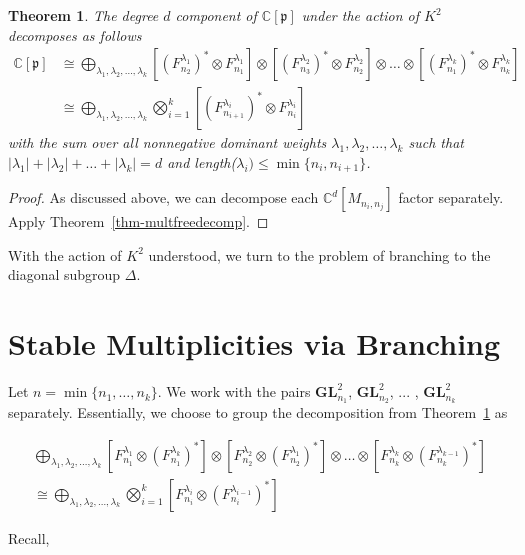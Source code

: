 \documentclass[11pt]{article}
\newtheorem{thm}[theo]{Theorem}
\theoremstyle{definition}
\numberwithin{equation}{section}
\newcommand{\C}{\mathbb{C}}
\newcommand{\p}{\mathfrak{p}}
\newcommand{\GL}{\textbf{GL}}
\begin{document}
    \begin{thm} \label{thm-biggroupdecomp}
        The degree $d$ component of $\C[\p]$ under the action of $K^2$ decomposes as follows 
        \begin{align*}
        \C[\p] &\cong \bigoplus_{\lambda_1, \lambda_2, \dots , \lambda_k} [(F_{n_2}^{\lambda_1})^*\otimes F_{n_1}^{\lambda_1}] \otimes [(F_{n_3}^{\lambda_2})^*\otimes F_{n_2}^{\lambda_2}] \otimes \dots \otimes [(F_{n_1}^{\lambda_k})^*\otimes F_{n_k}^{\lambda_k}]\\
        &\cong \bigoplus_{\lambda_1, \lambda_2, \dots , \lambda_k} \bigotimes_{i=1}^k [(F_{n_{i+1}}^{\lambda_i})^* \otimes F_{n_i}^{\lambda_i}]
        \end{align*}
        with the sum over all nonnegative dominant weights $\lambda_1, \lambda_2, \dots ,\lambda_k$ such that $|\lambda_1| + |\lambda_2| + \dots + |\lambda_k| = d$ and length($\lambda_i) \leq \min\{n_i,n_{i+1}\}$.
    \end{thm}

    \begin{proof}
        As discussed above, we can decompose each $\C^d[M_{n_i,n_j}]$ factor separately. Apply Theorem~\ref{thm-multfreedecomp}.
    \end{proof}


With the action of $K^2$ understood, we turn to the problem of branching to the diagonal subgroup $\Delta$. 


\section{Stable Multiplicities via Branching}


Let $n = \min \{n_1, \dots , n_k\}$. We work with the pairs $\GL_{n_1}^2$, $\GL_{n_2}^2$, ... , $\GL_{n_k}^2$ separately. Essentially, we choose to group the decomposition from Theorem~\ref{thm-biggroupdecomp} as

\begin{gather*}
\bigoplus_{\lambda_1, \lambda_2, \dots , \lambda_k} [F_{n_1}^{\lambda_1}\otimes (F_{n_1}^{\lambda_k})^*] \otimes [F_{n_2}^{\lambda_2}\otimes (F_{n_2}^{\lambda_1})^*] \otimes \dots \otimes [F_{n_k}^{\lambda_k}\otimes (F_{n_k}^{\lambda_{k-1}})^*] \\
\cong \bigoplus_{\lambda_1, \lambda_2, \dots , \lambda_k} \bigotimes_{i=1}^k [F_{n_i}^{\lambda_i}\otimes (F_{n_i}^{\lambda_{i-1}})^*]
\end{gather*}

Recall,
\end{document}
